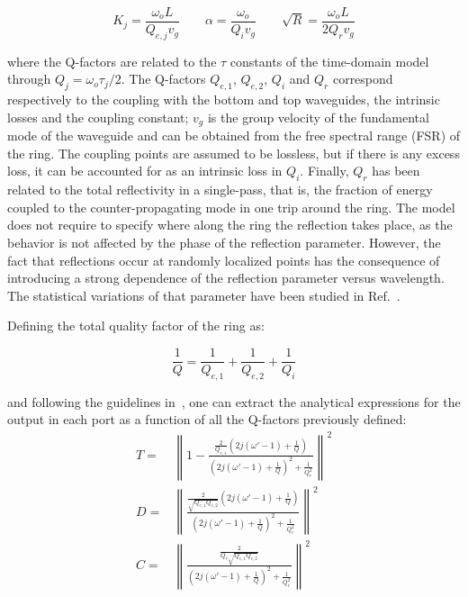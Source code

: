 \documentclass[10pt,letterpaper]{article}
\begin{document}
\begin{equation}
    K_j=\frac{\omega_oL}{Q_{e,j} v_g}  \qquad \alpha=\frac{\omega_o}{Q_i v_g} \qquad \sqrt{R}=\frac{\omega_oL}{2Q_rv_g}
\label{eq:space-constants}
\end{equation}

where the Q-factors are related to the $\tau$ constants of the time-domain model through $Q_j=\omega_o \tau_j/2$. The Q-factors $Q_{e,1}$, $Q_{e,2}$, $Q_{i}$ and $Q_{r}$ correspond respectively to the coupling with the bottom and top waveguides, the intrinsic losses and the coupling constant; $v_g$ is the group velocity of the fundamental mode of the waveguide and can be obtained from the free spectral range (FSR) of the ring. The coupling points are assumed to be lossless, but if there is any excess loss, it can be accounted for as an intrinsic loss in $Q_i$.  Finally, $Q_r$ has been related to the total reflectivity in a single-pass, that is, the fraction of energy coupled to the counter-propagating mode in one trip around the ring. The model does not require to specify where along the ring the reflection takes place, as the behavior is not affected by the phase of the reflection parameter. However, the fact that reflections occur at randomly localized points has the consequence of introducing a strong dependence of the reflection parameter versus wavelength. The statistical variations of that parameter have been studied in Ref.~\cite{Morichetti2010}.

Defining the total quality factor of the ring as:

\begin{equation}
	    \frac{1}{Q}=\frac{1}{Q_{e,1}}+\frac{1}{Q_{e,2}}+\frac{1}{Q_i}
\label{eq:Q_def}
\end{equation}

and following the guidelines in~\cite{Haus1984,Little1997,Zhang2008}, one can extract the analytical expressions for the output in each port as a function of all the Q-factors previously defined:
\begin{subequations}
\label{eq:ports}
\begin{align}
	T=& \left\lVert1-\frac{        \frac{2}{Q_{e,1}}(2j(\omega '-1)+\frac{1}{Q})   }  {   (2j(\omega '-1)+\frac{1}{Q})^2+\frac{1}{Q_r^2}  }\right\rVert^2 \label{eq:T} \\
	D =& \left\lVert\frac{          \frac{2}{\sqrt{Q_{e,1}Q_{e,2}}}(2j(\omega '-1)+\frac{1}{Q})   }  {   (2j(\omega'-1)+\frac{1}{Q})^2+\frac{1}{Q_r^2}    }\right\rVert^2 \label{eq:D} \\
	C=& \left\lVert\frac{          \frac{2}{Q_r\sqrt{Q_{e,1}Q_{e,2}}}   }  {   (2j(\omega'-1)+\frac{1}{Q})^2+\frac{1}{Q_r^2}    }\right\rVert^2 \label{eq:CD}
\end{align}
\end{subequations}
\end{document}
